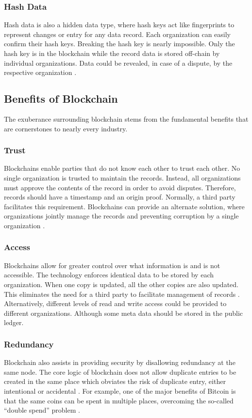 \documentclass[sigconf]{acmart}
\begin{document}
\subsubsection{Hash Data} Hash data is also a hidden data type, where hash keys act like fingerprints to represent changes or entry for any data record. Each organization can easily confirm their hash keys. Breaking the hash key is nearly impossible. Only the hash key is in the blockchain while the record data is stored off-chain by individual organizations. Data could be revealed, in case of a dispute, by the respective organization \cite{arbc1}.

\subsection{Benefits of Blockchain}
The exuberance surrounding blockchain stems from the fundamental benefits that are cornerstones to nearly every industry.

\subsubsection{Trust} Blockchains enable parties that do not know each other to trust each other. No single organization is trusted to maintain the records. Instead, all organizations must approve the contents of the record in order to avoid disputes. Therefore, records should have a timestamp and an origin proof. Normally, a third party facilitates this requirement. Blockchains can provide an alternate solution, where organizations jointly manage the records and preventing corruption by a single organization \cite{arbc1}. 

\subsubsection{Access} Blockchains allow for greater control over what information is and is not accessible. The technology enforces identical data to be stored by each organization. When one copy is updated, all the other copies are also updated. This eliminates the need for a third party to facilitate management of records \cite{arbc3}. Alternatively, different levels of read and write access could be provided to different organizations. Although some meta data should be stored in the public ledger. 

\subsubsection{Redundancy} Blockchain also assists in providing security by disallowing redundancy at the same node. The core logic of blockchain does not allow duplicate entries to be created in the same place which obviates the risk of duplicate entry, either intentional or accidental \cite{arbc4}.  For example, one of the major benefits of Bitcoin is that the same coins can be spent in multiple places, overcoming the so-called  ``double spend'' problem \cite{tapscott}.
\end{document}
